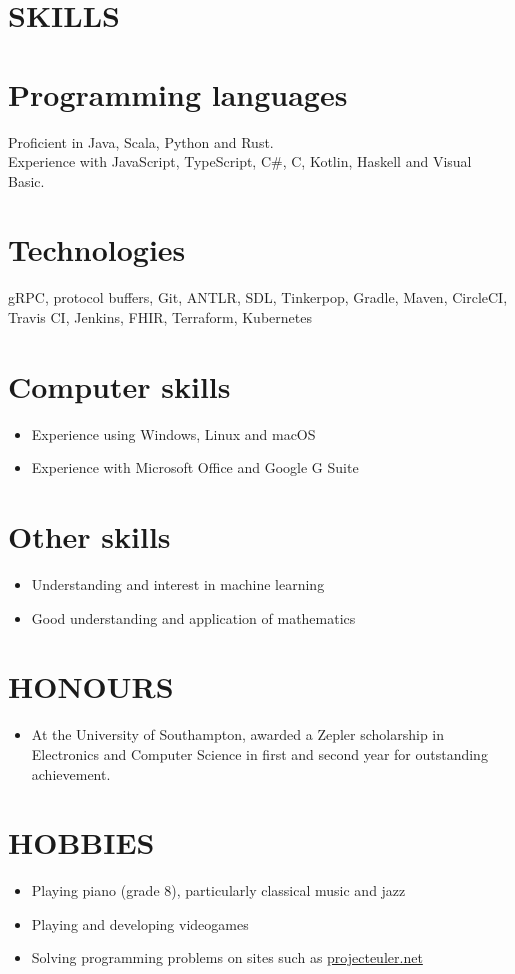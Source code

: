 \documentclass[margin]{res}
\begin{document}
\begin{resume}
\section{SKILLS}

\normalsize{\section{Programming languages}}
Proficient in Java, Scala, Python and Rust. \\
Experience with JavaScript, TypeScript, C\#, C, Kotlin, Haskell and Visual Basic.

\normalsize{\section{Technologies}}
gRPC, protocol buffers, Git, ANTLR, SDL, Tinkerpop, Gradle, Maven, CircleCI, Travis CI, Jenkins, FHIR, Terraform, Kubernetes

\normalsize{\section{Computer skills}}
\begin{itemize}
\item Experience using Windows, Linux and macOS
\item Experience with Microsoft Office and Google G Suite
\end{itemize}

\normalsize{\section{Other skills}}
\begin{itemize}
\item Understanding and interest in machine learning
\item Good understanding and application of mathematics
\end{itemize}

\section{HONOURS}
\begin{itemize}
\item At the University of Southampton, awarded a Zepler scholarship in
Electronics and Computer Science in first and second year for outstanding
achievement.
\end{itemize}

\section{HOBBIES}
\begin{itemize}
\item Playing piano (grade 8), particularly classical music and jazz
\item Playing and developing videogames
\item Solving programming problems on sites such as
\href{https://projecteuler.net/}{projecteuler.net}
\end{itemize}

\end{resume}
\end{document}
